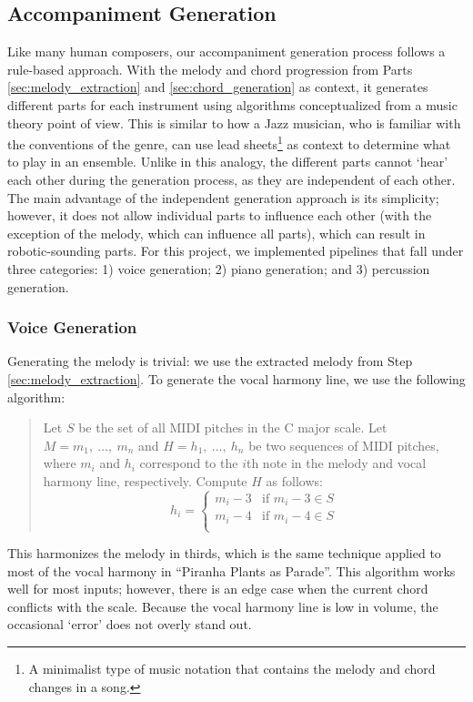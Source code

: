 \subsection{Accompaniment Generation}
\label{sec:accompaniment_generation}

Like many human composers, our accompaniment generation process follows a rule-based approach. With the melody and chord progression from Parts \ref{sec:melody_extraction} and \ref{sec:chord_generation} as context, it generates different parts for each instrument using algorithms conceptualized from a music theory point of view. This is similar to how a Jazz musician, who is familiar with the conventions of the genre, can use lead sheets\footnote{A minimalist type of music notation that contains the melody and chord changes in a song.} as context to determine what to play in an ensemble. Unlike in this analogy, the different parts cannot `hear' each other during the generation process, as they are independent of each other. The main advantage of the independent generation approach is its simplicity; however, it does not allow individual parts to influence each other (with the exception of the melody, which can influence all parts), which can result in robotic-sounding parts. For this project, we implemented pipelines that fall under three categories: 1) voice generation; 2) piano generation; and 3) percussion generation.

\subsubsection{Voice Generation}

Generating the melody is trivial: we use the extracted melody from Step \ref{sec:melody_extraction}. To generate the vocal harmony line, we use the following algorithm:
\begin{quote}
    Let $S$ be the set of all MIDI pitches in the C major scale.
    Let $M = m_1, \ \ldots, \ m_n$ and $H = h_1, \ \ldots, \ h_n$ be two sequences of MIDI pitches, where $m_i$ and $h_i$ correspond to the $i$th note in the melody and vocal harmony line, respectively.
    Compute $H$ as follows:
    $$h_i = \begin{cases}
        m_i - 3 & \text{if }m_i - 3 \in S \\
        m_i - 4 & \text{if }m_i - 4 \in S \\
    \end{cases}$$
\end{quote}
This harmonizes the melody in thirds, which is the same technique applied to most of the vocal harmony in ``Piranha Plants as Parade''. This algorithm works well for most inputs; however, there is an edge case when the current chord conflicts with the scale. Because the vocal harmony line is low in volume, the occasional `error' does not overly stand out.

